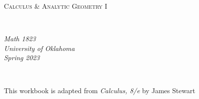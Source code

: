 \documentclass[notes]{subfiles}
\begin{document}
\rhead{}
\lhead{}
\chead{}
\thispagestyle{empty}
\[\]
\vspace{1in}
\begin{center}
	\begin{Huge}
		\textsc{Calculus \& Analytic Geometry I}
	\end{Huge}\\
		\vspace{2in}
	\begin{Large}
		\emph{Math 1823}\\
		\emph{University of Oklahoma}\\
		\emph{Spring 2023}
	\end{Large}\\
\end{center}
\vspace{2in}
\begin{center}
	This workbook is adapted from \emph{Calculus, 8/e} by James Stewart
\end{center}
\newpage
\thispagestyle{empty}
	\[\]
\end{document}

